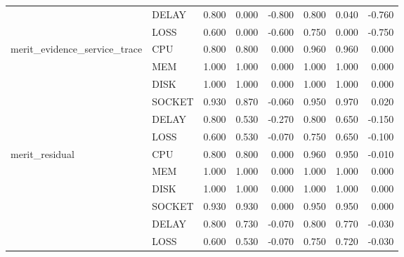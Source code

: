 \begin{longtable}{llrrrrrr}
 & DELAY & 0.800 & 0.000 & -0.800 & 0.800 & 0.040 & -0.760 \\
 & LOSS & 0.600 & 0.000 & -0.600 & 0.750 & 0.000 & -0.750 \\
merit\_evidence\_service\_trace & CPU & 0.800 & 0.800 & 0.000 & 0.960 & 0.960 & 0.000 \\
 & MEM & 1.000 & 1.000 & 0.000 & 1.000 & 1.000 & 0.000 \\
 & DISK & 1.000 & 1.000 & 0.000 & 1.000 & 1.000 & 0.000 \\
 & SOCKET & 0.930 & 0.870 & -0.060 & 0.950 & 0.970 & 0.020 \\
 & DELAY & 0.800 & 0.530 & -0.270 & 0.800 & 0.650 & -0.150 \\
 & LOSS & 0.600 & 0.530 & -0.070 & 0.750 & 0.650 & -0.100 \\
merit\_residual & CPU & 0.800 & 0.800 & 0.000 & 0.960 & 0.950 & -0.010 \\
 & MEM & 1.000 & 1.000 & 0.000 & 1.000 & 1.000 & 0.000 \\
 & DISK & 1.000 & 1.000 & 0.000 & 1.000 & 1.000 & 0.000 \\
 & SOCKET & 0.930 & 0.930 & 0.000 & 0.950 & 0.950 & 0.000 \\
 & DELAY & 0.800 & 0.730 & -0.070 & 0.800 & 0.770 & -0.030 \\
 & LOSS & 0.600 & 0.530 & -0.070 & 0.750 & 0.720 & -0.030 \\
\bottomrule
\end{longtable}
